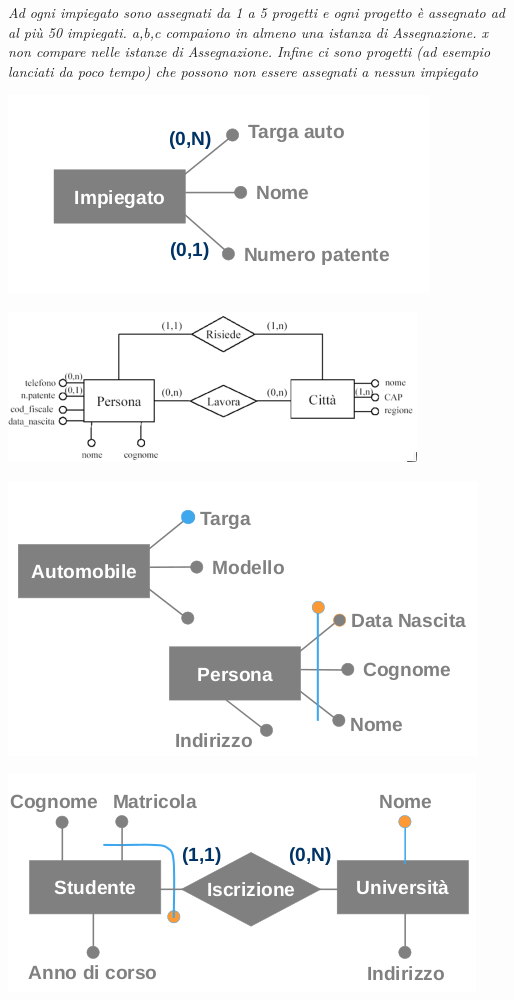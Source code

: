 \documentclass[a4paper,12pt, oneside]{book}
\begin{document}
\textit{Ad ogni impiegato sono assegnati da 1 a 5 progetti e ogni progetto è assegnato ad al più 50 impiegati. a,b,c compaiono in almeno una istanza di Assegnazione. x non compare nelle istanze di Assegnazione. Infine ci sono progetti (ad esempio lanciati da poco
	tempo) che possono non essere assegnati a nessun
	impiegato}\\
\begin{center}
	\includegraphics[scale=0.8]{img/er10.png}
\end{center}
\begin{center}
	\includegraphics[scale=0.8]{img/er11.png}
\end{center}
\begin{center}
	\includegraphics[scale=0.8]{img/er12.png}
\end{center}
\begin{center}
	\includegraphics[scale=0.8]{img/er13.png}
\end{center}
\end{document}

